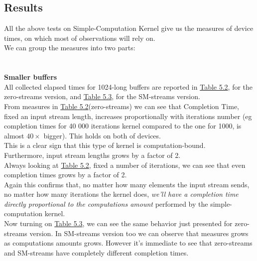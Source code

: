 \subsection{Results}
All the above tests on Simple-Computation Kernel give us the measures of device times, on which most of observations will rely on.\\
We can group the measures into two parts:\\\\\\
	{\large \textbf{Smaller buffers}}\\
	All collected elapsed times for 1024-long buffers are reported in \hyperref[tab:cosavgszero]{Table 5.2}, for the zero-streams version, and \hyperref[tab:cosavgsSM]{Table 5.3}, for the SM-streams version.\\
	From measures in \hyperref[tab:cosavgszero]{Table 5.2}(zero-streams) we can see that Completion Time, fixed an input stream length, increases proportionally with iterations number (eg completion times for 40 000 iterations kernel compared to the one for 1000, is almost \(40\times\) bigger). This holds on both of devices.\\
	This is a clear sign that this type of kernel is computation-bound.\\
	Furthermore, input stream lengths grows by a factor of 2.\\ 
	Always looking at  \hyperref[tab:cosavgszero]{Table 5.2}, fixed a number of iterations, we can see that even completion times grows by a factor of 2.\\
	Again this confirms that, no matter how many elements the input stream sends, no matter how many iterations the kernel does, \textit{we'll have a completion time directly proportional to the computations amount} performed by the simple-computation kernel.\\
	
	Now turning on \hyperref[tab:cosavgsSM]{Table 5.3}, we can see the same behavior just presented for zero-streams version. In SM-streams version too we can observe that measures grows as computations amounts grows. However it's immediate to see that zero-streams and SM-streams have completely different completion times.
			
